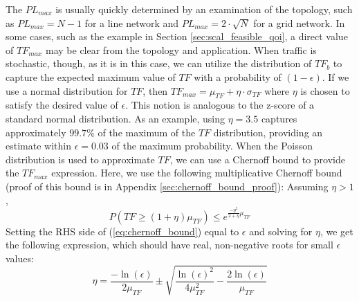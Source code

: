 The $PL_{max}$ is usually quickly determined by an examination of the topology, such as $PL_{max} = N-1$ for a line network and $PL_{max} = 2 \cdot \sqrt{N}$ for a grid network.  In some cases, such as the example in Section \ref{sec:scal_feasible_qoi}, a direct value of $TF_{max}$ may be clear from the topology and application.  When traffic is stochastic, though, as it is in this case, we can utilize the distribution of $TF_b$ to capture the expected maximum value of $TF$ with a probability of $(1-\epsilon)$.  If we use a normal distribution for $TF$, then $TF_{max} = \mu_{TF} + \eta \cdot \sigma_{TF}$ where $\eta$ is chosen to satisfy the desired value of $\epsilon$.  This notion is analogous to the z-score of a standard normal distribution.  As an example, using $\eta = 3.5$ captures approximately $99.7\%$ of the maximum of the $TF$ distribution, providing an estimate within $\epsilon = 0.03$ of the maximum probability.  When the Poisson distribution is used to approximate $TF$, we can use a Chernoff bound to provide the $TF_{max}$ expression.  
Here, we use the following multiplicative Chernoff bound (proof of this bound is in Appendix \ref{sec:chernoff_bound_proof}): 
Assuming $\eta > 1$,
\begin{equation}
\label{eq:chernoff_bound}
  P( TF \geq (1 + \eta)\mu_{TF} ) \leq e^{\frac{-\eta^2}{2+\eta}\mu_{TF}}
\end{equation}
Setting the RHS side of (\ref{eq:chernoff_bound}) equal to $\epsilon$ and solving for $\eta$, we get the following expression, which should have real, non-negative roots for small $\epsilon$ values:
\begin{equation}
  \eta = \frac{-\ln(\epsilon)}{2\mu_{TF}} \pm \sqrt{\frac{\ln(\epsilon)^2}{4\mu_{TF}^2} - \frac{2\ln(\epsilon)}{\mu_{TF}}}
\end{equation}



